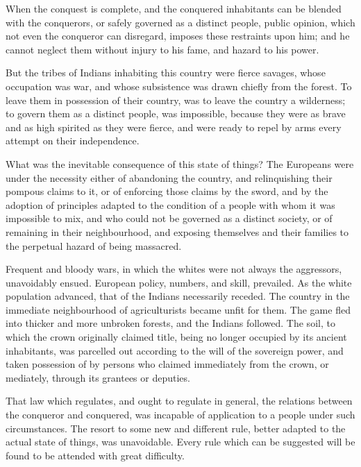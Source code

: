 When the conquest is complete, and the conquered inhabitants can be blended with
the conquerors, or safely governed as a distinct people, public opinion, which
not even the conqueror can disregard, imposes these restraints upon him; and he
cannot neglect them without injury to his fame, and hazard to his power.

But the tribes of Indians inhabiting this country were fierce savages, whose
occupation was war, and whose subsistence was drawn chiefly from the forest. To
leave them in possession of their country, was to leave the country a
wilderness; to govern them as a distinct people, was impossible, because they
were as brave and as high spirited as they were fierce, and were ready to repel
by arms every attempt on their independence.

What was the inevitable consequence of this state of things? The Europeans were
under the necessity either of abandoning the country, and relinquishing their
pompous claims to it, or of enforcing those claims by the sword, and by the
adoption of principles adapted to the condition of a people with whom it was
impossible to mix, and who could not be governed as a distinct society, or of
remaining in their neighbourhood, and exposing themselves and their families to
the perpetual hazard of being massacred.

Frequent and bloody wars, in which the whites were not always the aggressors,
unavoidably ensued. European policy, numbers, and skill, prevailed. As the white
population advanced, that of the Indians necessarily receded. The country in the
immediate neighbourhood of agriculturists became unfit for them. The game fled
into thicker and more unbroken forests, and the Indians followed. The soil, to
which the crown originally claimed title, being no longer occupied by its
ancient inhabitants, was parcelled out according to the will of the sovereign
power, and taken possession of by persons who claimed immediately from the
crown, or mediately, through its grantees or deputies.

That law which regulates, and ought to regulate in general, the relations
between the conqueror and conquered, was incapable of application to a people
under such circumstances. The resort to some new and different rule, better
adapted to the actual state of things, was unavoidable. Every rule which can be
suggested will be found to be attended with great difficulty.

